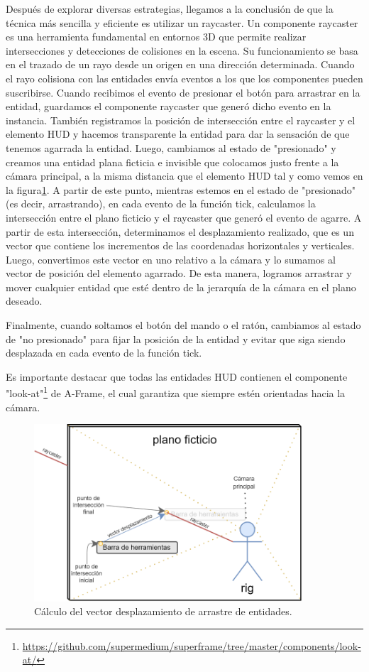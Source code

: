 \documentclass[a4paper, 11pt]{book}
\begin{document}
Después de explorar diversas estrategias, llegamos a la conclusión de que la técnica más sencilla y eficiente es utilizar un raycaster. Un componente raycaster es una herramienta fundamental en entornos 3D que permite realizar intersecciones y detecciones de colisiones en la escena. Su funcionamiento se basa en el trazado de un rayo desde un origen en una dirección determinada. Cuando el rayo colisiona con las entidades envía eventos a los que los componentes pueden suscribirse. Cuando recibimos el evento de presionar el botón para arrastrar en la entidad, guardamos el componente raycaster que generó dicho evento en la instancia. También registramos la posición de intersección entre el raycaster y el elemento HUD y hacemos transparente la entidad para dar la sensación de que tenemos agarrada la entidad. Luego, cambiamos al estado de "presionado" y creamos una entidad plana ficticia e invisible que colocamos justo frente a la cámara principal, a la misma distancia que el elemento HUD tal y como vemos en la figura\ref{fig:raycaster}. A partir de este punto, mientras estemos en el estado de "presionado" (es decir, arrastrando), en cada evento de la función tick, calculamos la intersección entre el plano ficticio y el raycaster que generó el evento de agarre. A partir de esta intersección, determinamos el desplazamiento realizado, que es un vector que contiene los incrementos de las coordenadas horizontales y verticales. Luego, convertimos este vector en uno relativo a la cámara y lo sumamos al vector de posición del elemento agarrado. De esta manera, logramos arrastrar y mover cualquier entidad que esté dentro de la jerarquía de la cámara en el plano deseado.

Finalmente, cuando soltamos el botón del mando o el ratón, cambiamos al estado de "no presionado" para fijar la posición de la entidad y evitar que siga siendo desplazada en cada evento de la función tick.

Es importante destacar que todas las entidades HUD contienen el componente "look-at"\footnote{\url{https://github.com/supermedium/superframe/tree/master/components/look-at/}} de A-Frame, el cual garantiza que siempre estén orientadas hacia la cámara.

\begin{figure}[H]
  \centering
  \includegraphics[width=10cm, keepaspectratio]{img/custom-draggable.png}
  \caption{Cálculo del vector desplazamiento de arrastre de entidades.}
  \label{fig:raycaster}
\end{figure}
\end{document}
